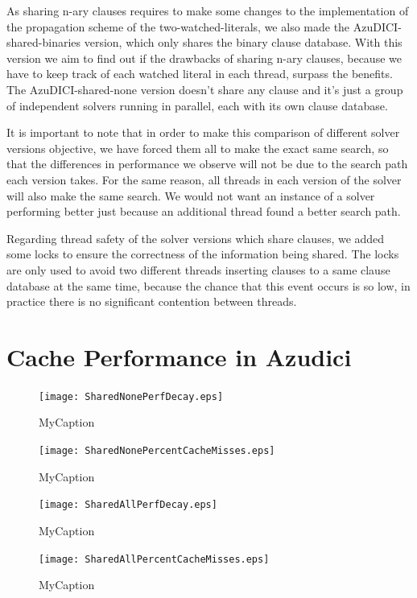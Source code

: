 \documentclass{llncs}
\begin{document}
As sharing n-ary clauses requires to make some changes to the
implementation of the propagation scheme of the two-watched-literals,
we also made the AzuDICI-shared-binaries version, which only shares
the binary clause database. With this version we aim to find out
if the drawbacks of sharing n-ary clauses, because we have to keep
track of each watched literal in each thread, surpass the benefits.
The AzuDICI-shared-none version doesn't share any clause and it's
just a group of independent solvers running in parallel, each with
its own clause database.

It is important to note that in order to make this comparison of
different solver versions objective, we have forced them all to make
the exact same search, so that the differences in performance we
observe will not be due to the search path each version takes.
For the same reason, all threads in each version of the solver will
also make the same search. We would not want an instance of a
solver performing better just because an additional thread found
a better search path.

Regarding thread safety of the solver versions which share clauses,
we added some locks to ensure the correctness of the information
being shared. The locks are only used to avoid two different threads
inserting clauses to a same clause database at the same time,
because the chance that this event occurs is so low, in practice
there is no significant contention between threads.

\section{Cache Performance in Azudici}

\begin{minipage}[h]{.5\linewidth}
  \begin{figure}[htp]
    \centering
    \texttt{[image: SharedNonePerfDecay.eps]}
    \caption{MyCaption}
    \label{fig:MyLabel}
  \end{figure}
  \begin{figure}[htp]
    \centering
    \texttt{[image: SharedNonePercentCacheMisses.eps]}
    \caption{MyCaption}
    \label{fig:MyLabel}
  \end{figure}
\end{minipage}


\begin{minipage}[h]{.5\linewidth}
  \begin{figure}[htp]
    \centering
    \texttt{[image: SharedAllPerfDecay.eps]}
    \caption{MyCaption}
    \label{fig:MyLabel}
  \end{figure}
  \begin{figure}[htp]
    \centering
    \texttt{[image: SharedAllPercentCacheMisses.eps]}
    \caption{MyCaption}
    \label{fig:MyLabel}
  \end{figure}
\end{minipage}
\end{document}
